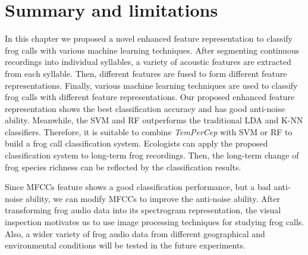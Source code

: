 \section{Summary and limitations}
In this chapter we proposed a novel enhanced feature representation to classify frog calls with various machine learning techniques. After segmenting continuous recordings into individual syllables, a variety of acoustic features are extracted from each syllable. Then, different features are fused to form different feature representations. Finally, various machine learning techniques are used to classify frog calls with different feature representations.
Our proposed enhanced feature representation shows the best classification accuracy and has good anti-noise ability. Meanwhile, the SVM and RF outperforms the traditional LDA and K-NN classifiers. Therefore, it is suitable to combine \textit{TemPerCep} with SVM or RF to build a frog call classification system. Ecologists can apply the proposed classification system to long-term frog recordings. Then, the long-term change of frog species richness can be reflected by the classification results. 

Since MFCCs feature shows a good classification performance, but a bad anti-noise ability, we can modify MFCCs to improve the anti-noise ability. After transforming frog audio data into its spectrogram representation, the visual inspection motivates us to use image processing techniques for studying frog calls. Also, a wider variety of frog audio data from different geographical and environmental conditions will be tested in the future experiments.
